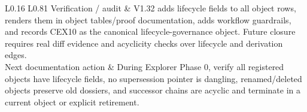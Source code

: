 \begin{longtable}{L{0.16\linewidth} L{0.81\linewidth}}
\hline\addlinespace[0.20em]
Verification /\allowbreak{} audit & V1.32 adds lifecycle fields to all object rows, renders them in object tables/\allowbreak{}proof documentation, adds workflow guardrails, and records CEX10 as the canonical lifecycle-governance object. Future closure requires real diff evidence and acyclicity checks over lifecycle and derivation edges.\\
\hline\addlinespace[0.20em]
Next documentation action & During Explorer Phase 0, verify all registered objects have lifecycle fields, no supersession pointer is dangling, renamed/\allowbreak{}deleted objects preserve old dossiers, and successor chains are acyclic and terminate in a current object or explicit retirement.\\
\hline\addlinespace[0.20em]
\end{longtable}
